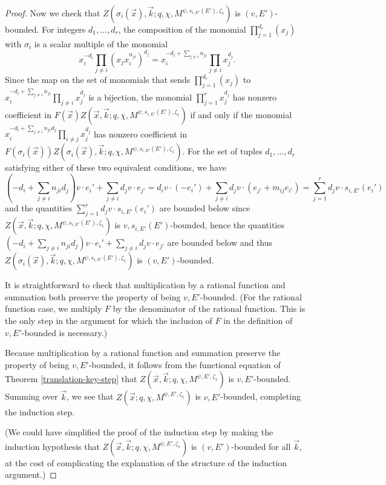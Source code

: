 \documentclass[11pt,letterpaper]{article}
\theoremstyle{definition}
\theoremstyle{remark}
\numberwithin{equation}{section}
\theoremstyle{dotless}
\newcommand{\hchi}{\psi} %
\newcommand{\gene}{\zeta_1} %
\begin{document}
\begin{proof}
Now we check that $Z ( \sigma_i( \vec{x}), \vec{k}; q, \chi, M^{\hchi, s_{i,E'}(E'),\gene})$ is $ (v, E')$-bounded.  For integers $d_1,\dots, d_r$, the composition of the monomial $\prod_{j=1}^{d_r} (x_j)$ with $\sigma_i$ is a scalar multiple of the monomial \[ x_i^{-d_i} \prod_{j \neq i} (x_j  x_i^{n_{ji}})^{d_j} = x_i^{-d_i +  \sum_{j\neq i} n_{ji}} \prod_{j \neq i} x_j^{d_j}.\] Since the map on the set of monomials that sends $\prod_{j=1}^{d_r} (x_j)$ to $x_i^{-d_i +  \sum_{j\neq i} n_{ji}} \prod_{j\neq i} x_j^{d_j}$ is a bijection, the monomial $\prod_{j=1}^r x_j^{d_j}$ has nonzero coefficient in $ F(\vec{x})Z ( \vec{x}, \vec{k}; q, \chi, M^{\hchi, s_{i,E'}(E'),\gene})$ if and only if the monomial  $x_i^{-d_i +  \sum_{j\neq i} n_{ji} d_j} \prod_{i\neq j} x_j^{d_j}$ has nonzero coefficient in  $F(\sigma_i(\vec{x}))Z ( \sigma_i(\vec{x}), \vec{k}; q, \chi, M^{\hchi, s_{i,E'}(E'),\gene})$.  For the set of tuples $d_1,\dots, d_r$ satisfying either of these two equivalent conditions, we have 
\[ (-d_i +  \sum_{j\neq i} n_{ji} d_j)  v \cdot e_i' + \sum_{j \neq i}  d_j v \cdot e_{j'} = d_i v\cdot (-e_i') + \sum_{j\neq i} d_j v \cdot (e_{j'} + m_{ij} e_{i'}) = \sum_{j=1}^r d_j v\cdot s_{i,E'}(e_i') \] 
and the quantities $\sum_{j=1}^r d_j v\cdot s_{i,E'}(e_i')$ are bounded below since $Z ( \vec{x}, \vec{k}; q, \chi, M^{\hchi, s_{i,E'}(E'),\gene})$ is $v,s_{i,E'}(E')$-bounded, hence the quantities $(-d_i +  \sum_{j\neq i} n_{ji} d_j)  v \cdot e_i' + \sum_{j \neq i}  d_j v \cdot e_{j'}$ are bounded below and thus $Z ( \sigma_i( \vec{x}), \vec{k}; q, \chi, M^{\hchi, s_{i,E'}(E'),\gene} )$ is $ (v, E')$-bounded.

It is straightforward to check that multiplication by a rational function and summation both preserve the property of being $v,E'$-bounded. (For the rational function case, we multiply $F$ by the denominator of the rational function. This is the only step in the argument for which the inclusion of $F$ in the definition of $v,E'$-bounded is necessary.)

Because multiplication by a rational function and summation preserve the property of being $v,E'$-bounded, it follows from the functional equation of Theorem \ref{translation-key-step} that $Z ( \vec{x}, \vec{k}; q, \chi, M^{\hchi, E',\gene})$ is $v,E'$-bounded. Summing over $\vec{k}$, we see that $Z ( \vec{x}; q, \chi, M^{\hchi, E',\gene})$ is $v,E'$-bounded, completing the induction step.

(We could have simplified the proof of the induction step by making the induction hypothesis that $Z ( \vec{x}, \vec{k}; q, \chi, M^{\hchi, E',\gene})$ is $(v,E')$-bounded for all $\vec{k}$, at the cost of complicating the explanation of the structure of the induction argument.) \end{proof}
\end{document}
